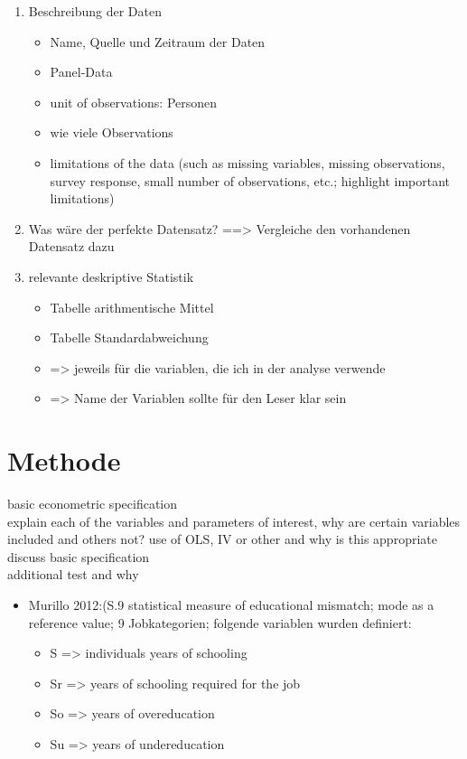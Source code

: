 \documentclass[a4paper,11pt]{scrartcl}
\begin{document}
\begin{enumerate}

\item Beschreibung der Daten 
	\begin{itemize}
		\item Name, Quelle und Zeitraum der Daten
		\item Panel-Data
		\item unit of observations: Personen 
		\item wie viele Observations
		\item limitations of the data (such as missing 	variables, missing observations, survey response, small number of observations, etc.; highlight important limitations)
	\end{itemize}
\item Was wäre der perfekte Datensatz? ==> Vergleiche den vorhandenen Datensatz dazu\\

\item relevante deskriptive Statistik 
	\begin{itemize}
		\item Tabelle arithmentische Mittel
		\item Tabelle Standardabweichung 
		\item => jeweils für die variablen, die ich in der analyse verwende
		\item => Name der Variablen sollte für den Leser klar sein 
	\end{itemize}


\end{enumerate}





\newpage
\section{Methode}
basic econometric specification\\
explain each of the variables and parameters of interest, why are certain variables included and others not? use of OLS, IV or other and why is this appropriate\\
discuss basic specification\\
additional test and why\\


\begin{itemize}
\item Murillo 2012:(S.9 statistical measure of educational mismatch; mode as a reference value; 9 Jobkategorien; folgende variablen wurden definiert: 
\begin{itemize}
\item S => individuals years of schooling
\item Sr => years of schooling required for the job
\item So => years of overeducation
\item Su => years of undereducation

\end{itemize}

\end{itemize}
\end{document}
